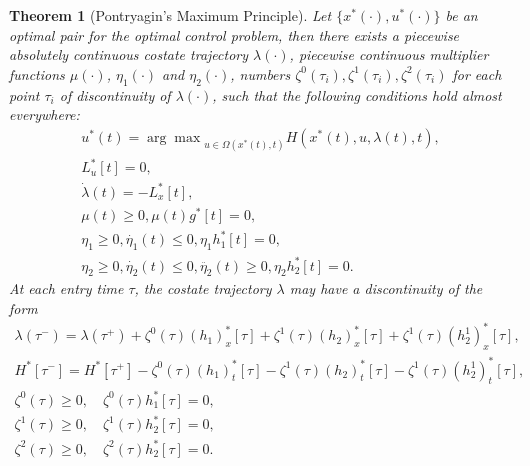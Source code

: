 \documentclass[a4paper]{article}
\theoremstyle{definition}
\theoremstyle{plain}
\newtheorem{theorem}{Theorem\hspace{0.25em}\ignorespaces}
\begin{document}
\begin{theorem}[Pontryagin's Maximum Principle]
Let $\{ x^{*}(\cdot), u^{*}(\cdot) \}$ be an optimal pair for the optimal
control problem, then there exists a piecewise absolutely continuous costate
trajectory $\lambda(\cdot)$, piecewise continuous multiplier functions
$\mu(\cdot)$, $\eta_{1}(\cdot)$ and $\eta_{2}(\cdot)$, numbers
$\zeta^{0}(\tau_{i}), \zeta^{1}(\tau_{i}), \zeta^{2}(\tau_{i})$ for each point
$\tau_{i}$ of discontinuity of $\lambda(\cdot)$, such that the following
conditions hold almost everywhere:
\begin{gather*}
  u^{*}(t) = {\arg\max}_{u \in \Omega(x^{*}(t), t)} H(x^{*}(t),u,\lambda(t),t) , \\
  L_{u}^{*}[t] = 0 , \\
  \dot{\lambda}(t) = -L_{x}^{*}[t] , \\
  \mu(t) \geq 0, \mu(t) g^{*}[t] = 0 , \\
  \eta_{1} \geq 0, \dot{\eta_{1}}(t) \leq 0 , \eta_{1}h_{1}^{*}[t] = 0 , \\
  \eta_{2} \geq 0, \dot{\eta_{2}}(t) \leq 0 , \ddot{\eta_{2}}(t) \geq 0, \eta_{2}h_{2}^{*}[t] = 0 .
\end{gather*}
%
At each entry time $\tau$, the costate trajectory $\lambda$ may have a
discontinuity of the form
\begin{gather*}
  \lambda(\tau^{-}) = \lambda(\tau^{+}) + \zeta^{0}(\tau)(h_{1})_{x}^{*}[\tau] + \zeta^{1}(\tau)(h_{2})_{x}^{*}[\tau] + \zeta^{1}(\tau)(h_{2}^{1})_{x}^{*}[\tau] , \\
  H^{*}[\tau^{-}] = H^{*}[\tau^{+}] - \zeta^{0}(\tau)(h_{1})_{t}^{*}[\tau] - \zeta^{1}(\tau)(h_{2})_{t}^{*}[\tau] - \zeta^{1}(\tau)(h_{2}^{1})_{t}^{*}[\tau] , \\
  \zeta^{0}(\tau) \geq 0, \quad \zeta^{0}(\tau) h_{1}^{*}[\tau] = 0 , \\
  \zeta^{1}(\tau) \geq 0, \quad \zeta^{1}(\tau) h_{2}^{*}[\tau] = 0 , \\
  \zeta^{2}(\tau) \geq 0, \quad \zeta^{2}(\tau) h_{2}^{*}[\tau] = 0 .
\end{gather*}
\end{theorem}


\end{document}
